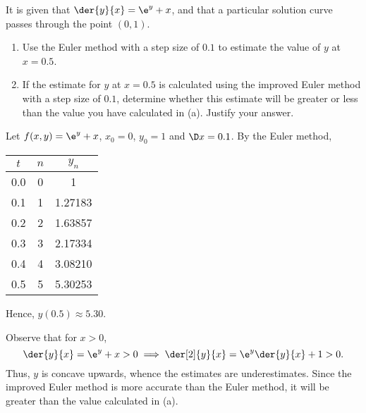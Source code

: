 \begin{problem}
    It is given that $\der{y}{x} = \e^y + x$, and that a particular solution curve passes through the point $(0, 1)$.
    \begin{enumerate}
        \item Use the Euler method with a step size of $0.1$ to estimate the value of $y$ at $x = 0.5$.
        \item If the estimate for $y$ at $x = 0.5$ is calculated using the improved Euler method with a step size of $0.1$, determine whether this estimate will be greater or less than the value you have calculated in (a). Justify your answer.
    \end{enumerate}
\end{problem}
\begin{solution}
    \begin{ppart}
        Let $f(x, y) = \e^y + x$, $x_0 = 0$, $y_0 = 1$ and $\D x = 0.1$. By the Euler method,

        \begin{center}
            \begin{tabular}{|c|c|c|}
                \hline
                $t$ & $n$ & $y_n$ \\ \hline\hline
                0.0 & 0 & 1 \\ \hline
                0.1 & 1 & 1.27183 \\ \hline
                0.2 & 2 & 1.63857 \\ \hline
                0.3 & 3 & 2.17334 \\ \hline
                0.4 & 4 & 3.08210 \\ \hline
                0.5 & 5 & 5.30253 \\ \hline
            \end{tabular}
        \end{center}
        
        Hence, $y(0.5) \approx 5.30$.
    \end{ppart}
    \begin{ppart}
        Observe that for $x > 0$, \[\der{y}{x} = \e^y + x > 0 \implies \der[2]{y}{x} = \e^y \der{y}{x} + 1 > 0.\] Thus, $y$ is concave upwards, whence the estimates are underestimates. Since the improved Euler method is more accurate than the Euler method, it will be greater than the value calculated in (a).
    \end{ppart}
\end{solution}

